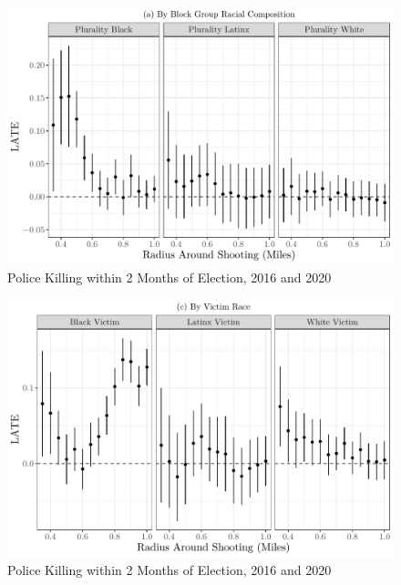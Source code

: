 \documentclass[
  12pt,
]{article}
\begin{document}
\begin{figure}[h]

{\centering \includegraphics{shoot_to_files/figure-latex/nhood-1} 

}

\caption{\label{fig:map}Police Killing within 2 Months of Election, 2016 and 2020}\label{fig:nhood}
\end{figure}

\begin{figure}[h]

{\centering \includegraphics{shoot_to_files/figure-latex/victim-1} 

}

\caption{\label{fig:map}Police Killing within 2 Months of Election, 2016 and 2020}\label{fig:victim}
\end{figure}
\end{document}
